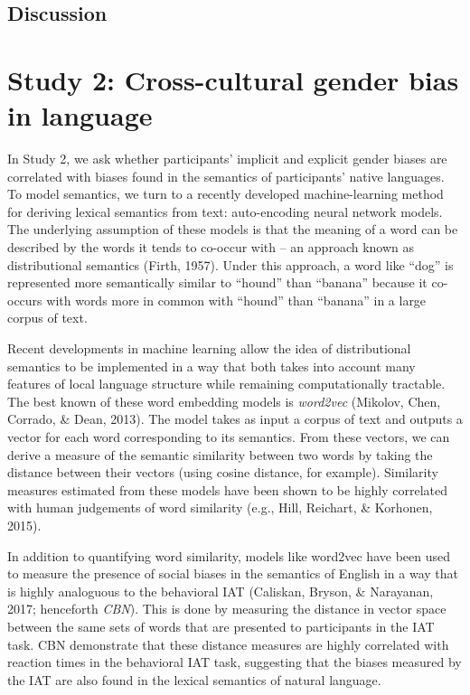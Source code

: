 \documentclass[10pt, letterpaper]{article}
\begin{document}
\subsection{Discussion}\label{discussion}

\section{Study 2: Cross-cultural gender bias in
language}\label{study-2-cross-cultural-gender-bias-in-language}

In Study 2, we ask whether participants' implicit and explicit gender
biases are correlated with biases found in the semantics of
participants' native languages. To model semantics, we turn to a
recently developed machine-learning method for deriving lexical
semantics from text: auto-encoding neural network models. The underlying
assumption of these models is that the meaning of a word can be
described by the words it tends to co-occur with -- an approach known as
distributional semantics (Firth, 1957). Under this approach, a word like
``dog'' is represented more semantically similar to ``hound'' than
``banana'' because it co-occurs with words more in common with ``hound''
than ``banana'' in a large corpus of text.

Recent developments in machine learning allow the idea of distributional
semantics to be implemented in a way that both takes into account many
features of local language structure while remaining computationally
tractable. The best known of these word embedding models is
\emph{word2vec} (Mikolov, Chen, Corrado, \& Dean, 2013). The model takes
as input a corpus of text and outputs a vector for each word
corresponding to its semantics. From these vectors, we can derive a
measure of the semantic similarity between two words by taking the
distance between their vectors (using cosine distance, for example).
Similarity measures estimated from these models have been shown to be
highly correlated with human judgements of word similarity (e.g., Hill,
Reichart, \& Korhonen, 2015).

In addition to quantifying word similarity, models like word2vec have
been used to measure the presence of social biases in the semantics of
English in a way that is highly analoguous to the behavioral IAT
(Caliskan, Bryson, \& Narayanan, 2017; henceforth \emph{CBN}). This is
done by measuring the distance in vector space between the same sets of
words that are presented to participants in the IAT task. CBN
demonstrate that these distance measures are highly correlated with
reaction times in the behavioral IAT task, suggesting that the biases
measured by the IAT are also found in the lexical semantics of natural
language.
\end{document}
